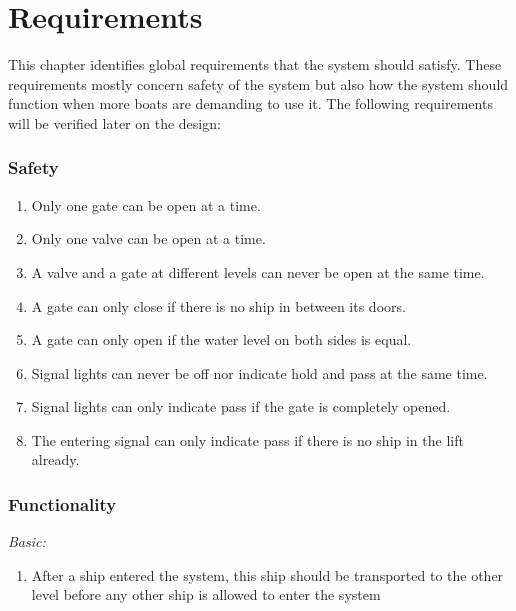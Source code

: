 \section{Requirements}
This chapter identifies global requirements that the system should satisfy. These requirements mostly concern safety of the system but also how the system should function when more boats are demanding to use it. The following requirements will be verified later on the design:

\subsubsection*{Safety}
\begin{enumerate}
	\item Only one gate can be open at a time.
	\item Only one valve can be open at a time.
	\item A valve and a gate at different levels can never be open at the same time.
	\item A gate can only close if there is no ship in between its doors.
	\item A gate can only open if the water level on both sides is equal.
	\item Signal lights can never be off nor indicate hold and pass at the same time.
	\item Signal lights can only indicate pass if the gate is completely opened.
	\item The entering signal can only indicate pass if there is no ship in the lift already.
\end{enumerate}

\subsubsection*{Functionality}
\textit{Basic:}
\begin{enumerate}
	\item After a ship entered the system, this ship should be transported to the other level before any other ship is allowed to enter the system
\end{enumerate}
